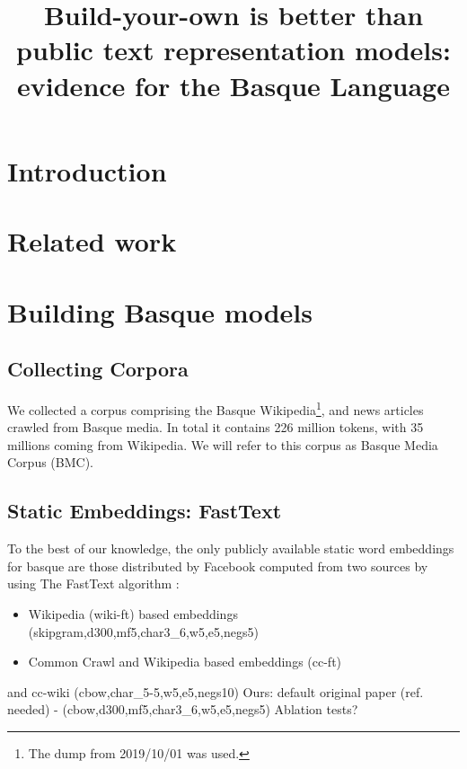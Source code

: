 \documentclass[10pt, a4paper]{article}
\title{Build-your-own is better than public text representation models: evidence for the Basque Language}
\begin{document}
\maketitleabstract

\section{Introduction}\label{sec:introduction}



\section{Related work}\label{sec:related-work}



\section{Building Basque models}\label{sec:build-basq-models}

\subsection{Collecting Corpora}\label{sec:build-basq-models:corpora}
 
 We collected a corpus comprising the Basque Wikipedia\footnote{The dump from 2019/10/01 was used.}, and news articles crawled from Basque media. In total it contains 226 million tokens, with 35 millions coming from Wikipedia. We will refer to this corpus as Basque Media Corpus (BMC).
 


 
\subsection{Static Embeddings: FastText}\label{sec:build-basq-models:static}

To the best of our knowledge, the only publicly available static word embeddings for basque are those distributed by Facebook computed from two sources by using The FastText algorithm \cite{}:
\begin{itemize}
    \item Wikipedia (wiki-ft) based embeddings \cite{fasttext1_bojanowski2017enriching} (skipgram,d300,mf5,char3\_6,w5,e5,negs5)
    \item Common Crawl and Wikipedia based embeddings (cc-ft) \cite{fasttext2_grave2018learning}
\end{itemize} and cc-wiki (cbow,char\_5-5,w5,e5,negs10)
Ours: default original paper (ref. needed) -  (cbow,d300,mf5,char3\_6,w5,e5,negs5)
Ablation tests?
\end{document}
